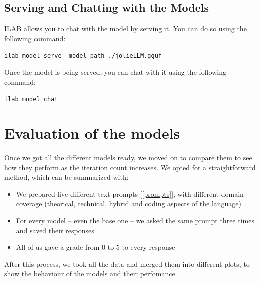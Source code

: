 \documentclass[12pt]{article}
\begin{document}
\subsection{Serving and Chatting with the Models}
ILAB allows you to chat with the model by serving it. You can do so using the following command:
\begin{center}
    \texttt{ilab model serve --model-path ./jolieLLM.gguf}
\end{center}
Once the model is being served, you can chat with it using the following command:
\begin{center}
    \texttt{ilab model chat}
\end{center}

\section{Evaluation of the models}
Once we got all the different models ready, we moved on to compare them to see how they perform as the iteration count increases. We opted for a straightforward method, which can be summarized with:
\begin{itemize}
    \item We prepared five different text prompts [\ref{prompts}], with different domain coverage (theorical, technical, hybrid and coding aspects of the language)
    \item For every model -- even the base one -- we asked the same prompt three times and saved their responses
    \item All of us gave a grade from 0 to 5 to every response
\end{itemize}
After this process, we took all the data and merged them into different plots, to show the behaviour of the models and their perfomance.
\end{document}
